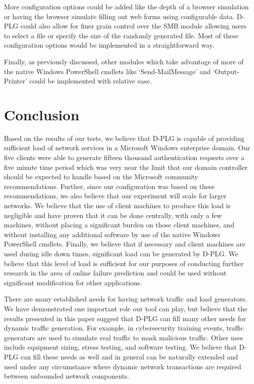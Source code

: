 More configuration options could be added like the depth of a browser
simulation or having the browser simulate filling out web forms using
configurable data.  D-PLG could also allow for finer grain control over the SMB
module allowing users to select a file or specify the size of the randomly
generated file.  Most of these configuration options would be implemented in a
straightforward way.

Finally, as previously discussed, other modules which take advantage of more of
the native Windows PowerShell cmdlets like `Send-MailMessage' and
`Output-Printer' could be implemented with relative ease.

\section{Conclusion} \label{sec:conclusion}
Based on the results of our tests, we believe that D-PLG is capable of
providing sufficient load of network services in a Microsoft Windows enterprise
domain.  Our five clients were able to generate fifteen thousand authentication
requests over a five minute time period which was very near the limit that our
domain controller should be expected to  handle based on the Microsoft
community recommendations.  Further, since our configuration was based on these
recommendations, we also believe that our experiment will scale for larger
networks.  We believe that the use of client machines to produce this load is
negligible and have proven that it can be done centrally, with only a few
machines, without placing a significant burden on those client machines, and
without installing any additional software by use of the native Windows
PowerShell cmdlets.  Finally, we believe that if necessary and client machines
are used during idle down times, significant load can be generated by D-PLG.
We believe that this level of load is sufficient for our purposes of conducting
further research in the area of online failure prediction and could be used
without significant modification for other applications.

There are many established needs for having network traffic and load
generators.  We have demonstrated one important role our tool can play, but
believe that the results presented in this paper suggest that D-PLG can fill
many other needs for dynamic traffic generation.  For example, in cybersecurity
training events, traffic generators are used to simulate real traffic to mask
malicious traffic.  Other uses include equipment sizing, stress testing, and
software testing.  We believe that D-PLG can fill these needs as well and in
general can be naturally extended and used under any circumstance where dynamic
network transactions are required between unbounded network components.
